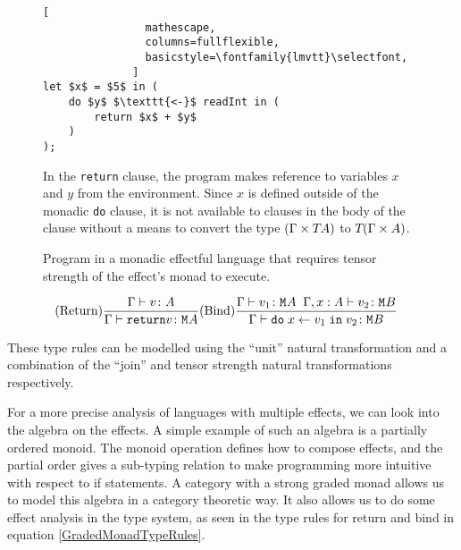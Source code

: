 \documentclass{Report}
\begin{document}
\begin{figure}
    \begin{framed}
        \begin{framed}
            \begin{lstlisting}[
                mathescape,
                columns=fullflexible,
                basicstyle=\fontfamily{lmvtt}\selectfont,
              ]
let $x$ = $5$ in (
    do $y$ $\texttt{<-}$ readInt in (
        return $x$ + $y$
    ) 
);
            \end{lstlisting}
        \end{framed}
        
In the \texttt{return} clause, the program makes reference to variables $x$ and $y$ from the environment. Since $x$ is defined outside of the monadic \texttt{do} clause, it is not available to clauses in the body of the clause without a means to convert the type $(\Gamma \times T_{}{A)}$ to $T_{}{(\Gamma\times A)}$.
    \end{framed}
   
\caption{Program in a monadic effectful language that requires tensor strength of the effect's monad to execute.}
\label{MonadStrengthRequirement}
\end{figure}

\begin{eqnarray}\label{MonadTypeRules}
    (\text{Return}) \frac{\Gamma \vdash v \colon A}{\Gamma \vdash \texttt{return} v \colon \texttt{M}_{}{A}} & (\text{Bind}) \frac{\Gamma \vdash v_1 \colon \texttt{M}_{}{A} \;\; \Gamma, x: A \vdash v_2 \colon \texttt{M}_{}{B}}{\Gamma \vdash \texttt{do}\; x \leftarrow v_1 \;\texttt{in}\; v_2 \colon \texttt{M}_{}{B}}
\end{eqnarray}

These type rules can be modelled using the ``unit'' natural transformation and a combination of the ``join'' and tensor strength natural transformations respectively. 

For a more precise analysis of languages with multiple effects, we can look into the algebra on the effects. A simple example of such an algebra is a partially ordered monoid. The monoid operation defines how to compose effects, and the partial order gives a sub-typing relation to make programming more intuitive with respect to if statements. A category with a strong graded monad allows us to model this algebra in a category theoretic way. It also allows us to do some effect analysis in the type system, as seen in the type rules for return and bind in equation \ref{GradedMonadTypeRules}.
\end{document}
